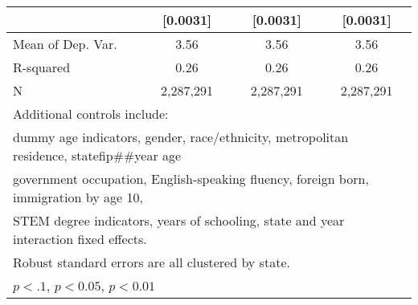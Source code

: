 \begin{table}[htbp]
\begin{tabular}{l*{3}{c}}
                    &    [0.0031]         &    [0.0031]         &    [0.0031]         \\
\midrule
Mean of Dep. Var.   &        3.56         &        3.56         &        3.56         \\
R-squared           &        0.26         &        0.26         &        0.26         \\
N                   &   2,287,291         &   2,287,291         &   2,287,291         \\
\bottomrule
\multicolumn{4}{l}{\footnotesize Additional controls include:}\\
\multicolumn{4}{l}{\footnotesize dummy age indicators, gender, race/ethnicity, metropolitan residence, statefip##year age}\\
\multicolumn{4}{l}{\footnotesize government occupation, English-speaking fluency, foreign born, immigration by age 10,}\\
\multicolumn{4}{l}{\footnotesize STEM degree indicators, years of schooling, state and year interaction fixed effects.}\\
\multicolumn{4}{l}{\footnotesize Robust standard errors are all clustered by state.}\\
\multicolumn{4}{l}{\footnotesize \sym{*} \(p<.1\), \sym{**} \(p<0.05\), \sym{***} \(p<0.01\)}\\
\end{tabular}
\end{table}
